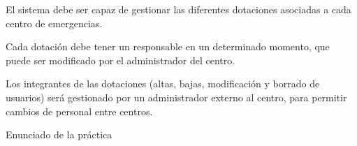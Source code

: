 {\reportauthors}
{El sistema debe ser capaz de gestionar las diferentes dotaciones asociadas a cada centro de emergencias. \par
Cada dotación debe tener un responsable en un determinado momento, que puede ser modificado por el administrador del centro. \par
Los integrantes de las dotaciones (altas, bajas, modificación y borrado de usuarios) será gestionado por un administrador externo al centro, para permitir cambios de personal entre centros.}
{}
{Enunciado de la práctica}

